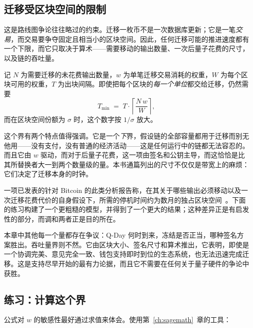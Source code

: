 \subsection{迁移受区块空间的限制}
\label{sec:migration-throughput}

这是路线图争论往往略过的约束。迁移一枚币不是一次数据库更新；它是一笔\emph{交易}，而交易要争夺固定且相当小的区块空间。因此，任何迁移可能的推进速度都有一个下限，而它只取决于算术——需要移动的输出数量、一次后量子花费的尺寸，以及链的吞吐量。

记 $N$ 为需要迁移的未花费输出数量，$w$ 为单笔迁移交易消耗的权重，$W$ 为每个区块可用的权重，$T$ 为出块间隔。即使把每个区块的\emph{每一个单位}都交给迁移，仍然需要
\[
  T_{\min} \;=\; T \cdot \left\lceil \frac{N\,w}{W} \right\rceil ,
\]
而在区块空间份额为 $\sigma$ 时，这个数字按 $1/\sigma$ 放大。

这个界有两个特点值得强调。它是一个\emph{下}界，假设链的全部容量都用于迁移而别无他用——没有支付，没有普通的经济活动——这是任何运行中的链都无法容忍的。而且它由 $w$ 驱动，而对于后量子花费，这一项由签名和公钥主导，而这恰恰是比其所替换者大一到两个数量级的量。本书通篇列出的尺寸不仅仅是带宽上的麻烦：它们决定了迁移本身的时钟。

一项已发表的针对 Bitcoin 的此类分析报告称，在其关于哪些输出必须移动以及一次迁移花费代价的自身假设下，所需的停机时间约为数月的独占区块空间~\cite{pont2024}。下面的练习构建了一个更粗糙的模型，并得到了一个更大的结果；这种差异正是有启发性的部分，而调和两者正是目的所在。

\begin{remark}[为何这重塑了整章的框架]
本章中其他每一个量都存在争议：Q-Day 何时到来，冻结是否正当，哪种签名方案胜出。吞吐量界则不然。它由区块大小、签名尺寸和算术推出，它表明，即使是一个协调完美、意见完全一致、钱包支持即时到位的生态系统，也无法迅速完成迁移。这是支持尽早开始的最有力论据，而且它不需要在任何关于量子硬件的争论中获胜。
\end{remark}

\subsection*{练习：计算这个界}

公式对 $w$ 的敏感性最好通过求值来体会。使用第~\ref{ch:sagemath}~章的工具：

